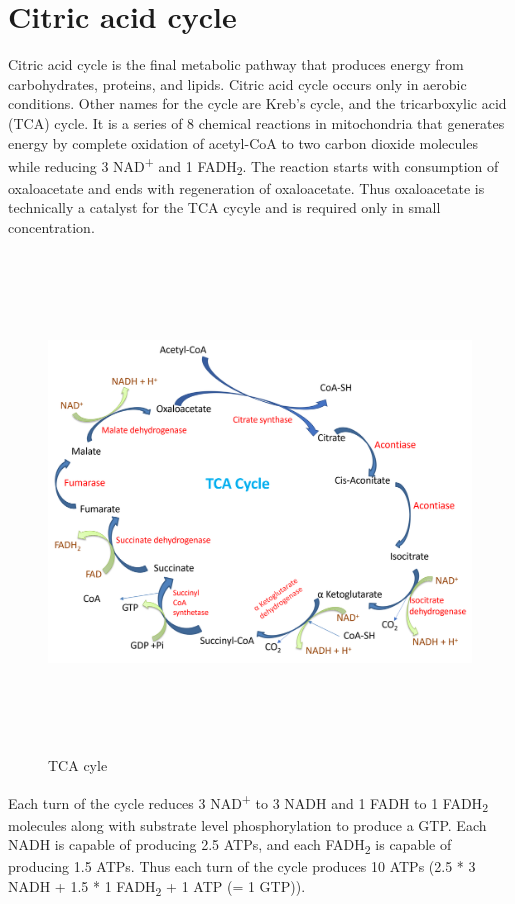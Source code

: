 \documentclass[
]{book}
\begin{document}
\section{Citric acid cycle}\label{citric-acid-cycle}

Citric acid cycle is the final metabolic pathway that produces energy from carbohydrates, proteins, and lipids. Citric acid cycle occurs only in aerobic conditions. Other names for the cycle are Kreb's cycle, and the tricarboxylic acid (TCA) cycle. It is a series of 8 chemical reactions in mitochondria that generates energy by complete oxidation of acetyl-CoA to two carbon dioxide molecules while reducing 3 NAD\textsuperscript{+} and 1 FADH\textsubscript{2}. The reaction starts with consumption of oxaloacetate and ends with regeneration of oxaloacetate. Thus oxaloacetate is technically a catalyst for the TCA cycyle and is required only in small concentration.

\begin{figure}
\centering
\includegraphics[width=\textwidth,height=5.20833in]{Images/TCA.png}
\caption{TCA cyle}
\end{figure}

Each turn of the cycle reduces 3 NAD\textsuperscript{+} to 3 NADH and 1 FADH to 1 FADH\textsubscript{2} molecules along with substrate level phosphorylation to produce a GTP. Each NADH is capable of producing 2.5 ATPs, and each FADH\textsubscript{2} is capable of producing 1.5 ATPs. Thus each turn of the cycle produces 10 ATPs (2.5 * 3 NADH + 1.5 * 1 FADH\textsubscript{2} + 1 ATP (= 1 GTP)).
\end{document}
